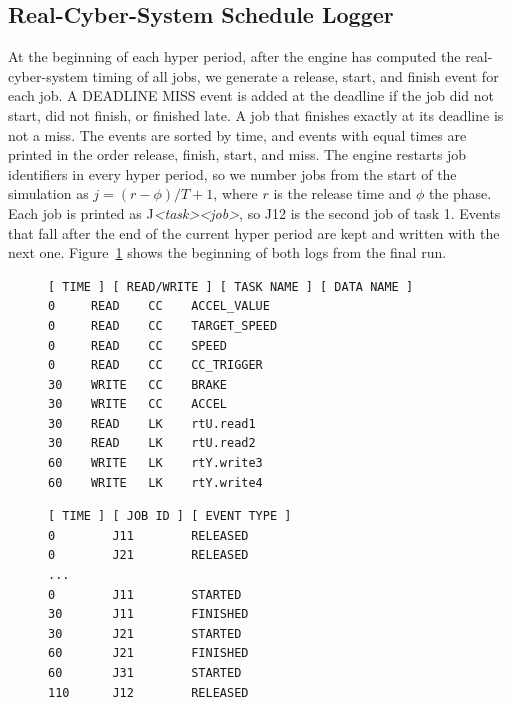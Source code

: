 \documentclass[11pt,a4paper]{article}
\begin{document}
\subsection{Real-Cyber-System Schedule Logger}
At the beginning of each hyper period, after the engine has computed the real-cyber-system timing of
all jobs, we generate a release, start, and finish event for each job. A DEADLINE MISS event is added
at the deadline if the job did not start, did not finish, or finished late. A job that finishes exactly at its
deadline is not a miss. The events are sorted by time, and events with equal times are printed in the
order release, finish, start, and miss. The engine restarts job identifiers in
every hyper period, so we number jobs from the start of the simulation as $j = (r - \phi)/T + 1$,
where $r$ is the release time and $\phi$ the phase. Each job is printed as
J\textit{<task><job>}, so J12 is the second job of task 1. Events that fall after the end of the
current hyper period are kept and written with the next one. Figure~\ref{lst:logs} shows the
beginning of both logs from the final run.

\begin{figure}[t]
\centering
\begin{minipage}[t]{0.52\linewidth}\scriptsize
\begin{verbatim}
[ TIME ] [ READ/WRITE ] [ TASK NAME ] [ DATA NAME ]
0     READ    CC    ACCEL_VALUE
0     READ    CC    TARGET_SPEED
0     READ    CC    SPEED
0     READ    CC    CC_TRIGGER
30    WRITE   CC    BRAKE
30    WRITE   CC    ACCEL
30    READ    LK    rtU.read1
30    READ    LK    rtU.read2
60    WRITE   LK    rtY.write3
60    WRITE   LK    rtY.write4
\end{verbatim}
\end{minipage}\hfill
\begin{minipage}[t]{0.40\linewidth}\scriptsize
\begin{verbatim}
[ TIME ] [ JOB ID ] [ EVENT TYPE ]
0        J11        RELEASED
0        J21        RELEASED
...
0        J11        STARTED
30       J11        FINISHED
30       J21        STARTED
60       J21        FINISHED
60       J31        STARTED
110      J12        RELEASED
\end{verbatim}
\end{minipage}
\label{lst:logs}
\end{figure}
\end{document}
